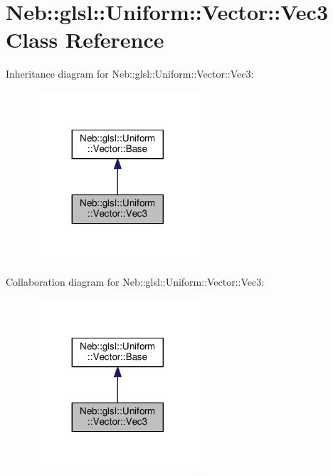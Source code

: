 \hypertarget{classNeb_1_1glsl_1_1Uniform_1_1Vector_1_1Vec3}{\section{Neb\-:\-:glsl\-:\-:Uniform\-:\-:Vector\-:\-:Vec3 Class Reference}
\label{classNeb_1_1glsl_1_1Uniform_1_1Vector_1_1Vec3}
}


Inheritance diagram for Neb\-:\-:glsl\-:\-:Uniform\-:\-:Vector\-:\-:Vec3\-:
\nopagebreak
\begin{figure}[H]
\begin{center}
\leavevmode
\includegraphics[width=176pt]{classNeb_1_1glsl_1_1Uniform_1_1Vector_1_1Vec3__inherit__graph}
\end{center}
\end{figure}


Collaboration diagram for Neb\-:\-:glsl\-:\-:Uniform\-:\-:Vector\-:\-:Vec3\-:
\nopagebreak
\begin{figure}[H]
\begin{center}
\leavevmode
\includegraphics[width=176pt]{classNeb_1_1glsl_1_1Uniform_1_1Vector_1_1Vec3__coll__graph}
\end{center}
\end{figure}
